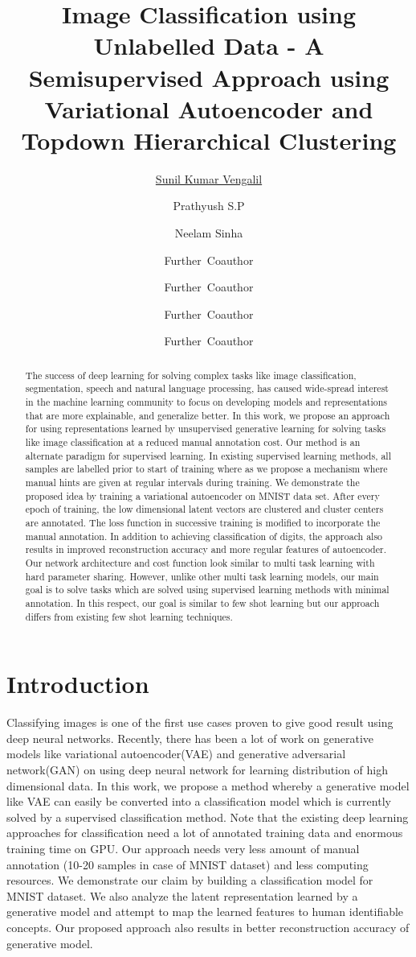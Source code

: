 \documentclass{uai2021} %
\title{Image Classification using Unlabelled Data - A Semisupervised Approach using Variational Autoencoder and Topdown Hierarchical Clustering}
\author[1]{\href{mailto:Sunil Kumar Vengalil <sunilkumar.vengalil@iiitb.org> ?Subject=Your UAI 2021 paper}{Sunil Kumar Vengalil}{}}
\author[2]{Prathyush S.P}
\author[1,2]{Neelam Sinha}
\author[3]{Further~Coauthor}
\author[1]{Further~Coauthor}
\author[3]{Further~Coauthor}
\author[3,1]{Further~Coauthor}
\affil[1]{%
    Computer Science Dept.\\
    Cranberry University\\
    Pittsburgh, Pennsylvania, USA
}
\affil[2]{%
    Affiliation\\
    Address\\
    …
}
\affil[3]{…}
\begin{document}
\maketitle

\begin{abstract}
The success of deep learning for solving complex tasks like image classification, segmentation, speech and natural language processing, has caused wide-spread interest in the machine learning community to focus on developing models and representations that are more explainable, and generalize better.
In this work, we propose an approach for using representations learned by unsupervised generative learning for solving tasks like image classification at a reduced manual annotation cost.
Our method is an alternate paradigm for supervised learning.
In existing supervised learning methods,  all samples are labelled prior to start of training where as we propose a mechanism where manual hints are given at regular intervals during training.
We demonstrate the proposed idea by training a  variational autoencoder on MNIST data set.
After every epoch of training, the low dimensional latent vectors are clustered and cluster centers are annotated.
The loss function in successive training is modified to incorporate the manual annotation.
In addition to achieving classification of digits, the approach also results in improved reconstruction accuracy and more regular features of autoencoder.
Our network architecture and cost function look similar to multi task learning with hard parameter sharing.
However, unlike other multi task learning models, our main goal is to solve tasks which are solved using supervised learning methods with minimal annotation.
In this respect, our goal is similar to few shot learning but our approach differs from existing few shot learning techniques.
\end{abstract}

\section{Introduction}\label{sec:intro}
Classifying images is one of the first use cases proven to give good result using deep neural networks.
Recently, there has been a lot of work on generative models like variational autoencoder(VAE)\cite{vae} and generative adversarial network(GAN) \cite{gan} on using deep neural network for learning distribution of high dimensional data.
In this work, we propose a method whereby a generative model like VAE can easily be converted into a classification model which is currently solved by a supervised classification method.
Note that the existing deep learning approaches for classification  need a lot of annotated training data and enormous training time on GPU\cite{krizhevsky2012imagenet}\cite{simonyan2014very}\cite{he2016deep}.
Our approach needs very less amount of manual annotation (10-20 samples in case of MNIST dataset)  and less computing resources.
We demonstrate our claim by building a classification model for MNIST dataset.
We also analyze the latent representation learned by a generative model and attempt to map the learned features to human identifiable concepts.
Our proposed approach also results in better reconstruction accuracy of generative model.
\end{document}
